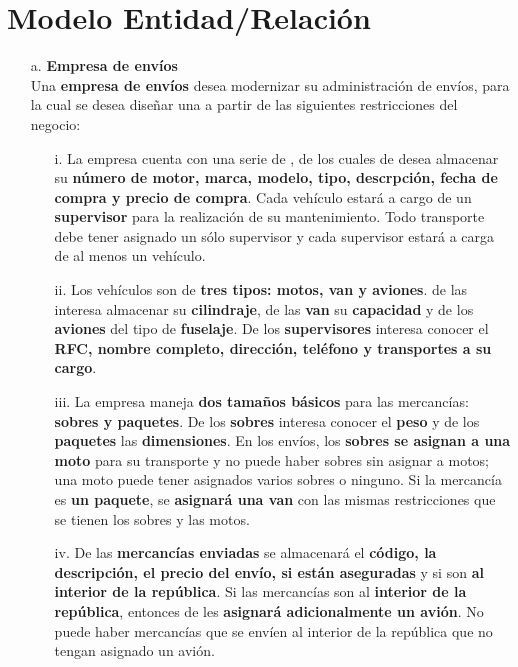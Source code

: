 \documentclass[letterpaper,11pt]{article}
\begin{document}
\section{Modelo Entidad/Relación}

\begin{itemize}
    \item[a.] \textbf{Empresa de envíos} \\
    Una \textbf{empresa de envíos} desea modernizar su administración de envíos,
    para la cual se desea diseñar una  a partir de las 
    siguientes restricciones del negocio:
    
    \begin{itemize}
        \item[i.] La empresa cuenta con una serie de ,
        de los cuales de desea almacenar su \textbf{número de motor, marca, modelo, 
        tipo, descrpción, fecha de compra y precio de compra}. Cada vehículo estará
        a cargo de un \textbf{supervisor} para la realización de su mantenimiento.
        Todo transporte debe tener asignado un sólo supervisor y cada supervisor 
        estará a carga de al menos un vehículo.
        
        \item[ii.] Los vehículos son de \textbf{tres tipos: motos, van y aviones}. 
        de las  interesa almacenar su \textbf{cilindraje}, de las 
        \textbf{van} su \textbf{capacidad} y de los \textbf{aviones} del tipo de 
        \textbf{fuselaje}. De los \textbf{supervisores} interesa conocer el 
        \textbf{RFC, nombre completo, dirección, teléfono y transportes a su cargo}.
    
        \item[iii.] La empresa maneja \textbf{dos tamaños básicos} para las 
        mercancías: \textbf{sobres y paquetes}. De los \textbf{sobres} interesa 
        conocer el \textbf{peso} y de los \textbf{paquetes} las \textbf{dimensiones}.
        En los envíos, los \textbf{sobres se asignan a una moto} para su 
        transporte y no puede haber sobres sin asignar a motos; una moto puede tener 
        asignados varios sobres o ninguno. Si la mercancía es \textbf{un paquete}, 
        se \textbf{asignará una van} con las mismas restricciones que se tienen los 
        sobres y las motos.
    
        \item[iv.] De las \textbf{mercancías enviadas} se almacenará el 
        \textbf{código, la descripción, el precio del envío, si están aseguradas} y
        si son \textbf{al interior de la república}. Si las mercancías son al 
        \textbf{interior de la república}, entonces de les \textbf{asignará 
        adicionalmente un avión}. No puede haber mercancías que se envíen al interior
        de la república que no tengan asignado un avión.
    

\end{itemize}
\end{itemize}
\end{document}
